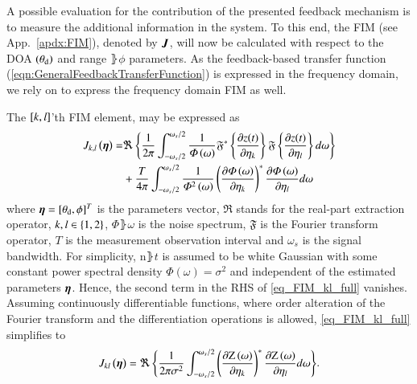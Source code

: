 A possible evaluation for the contribution of the presented feedback mechanism is to measure the additional information in the system.
To this end, the FIM (see App.~\ref{apdx:FIM}), denoted by $\boldsymbol{J}$, will now be calculated with respect to the DOA $\left({\theta_{\text{d}}}\right)$ and range $\rBrace{\phi}$ parameters. 
As the feedback-based transfer function (\ref{eqn:GeneralFeedbackTransferFunction}) is expressed in the frequency domain, we rely on \cite{zeira1990frequency} to express the frequency domain FIM as well. 
\par The $\left[{k,l}\right]$'th FIM element, may be expressed as
\begin{equation}\label{eq_FIM_kl_full}
    {
        \begin{split}
            J_{k,l}\left({\boldsymbol{\eta}}\right) 
            =&
            \Re\left\{{
            \frac{1}{2\pi}
            \int_{-\omega_{s}/2}^{\omega_{s}/2}
            {
            \frac{1}{\Phi\left({\omega}\right)}
            \mathfrak{F}^{*}\left\{
            \frac{\partial z(t)}{\partial\eta_{k}}
            \right\}
            \mathfrak{F}\left\{
            \frac{\partial z(t)}{\partial\eta_{l}}
            \right\}
            d\omega
            }}\right\}
            \\ &+
            \frac{T}{4\pi}
            \int_{-\omega_{s}/2}^{\omega_{s}/2}
            \frac{1}{\Phi^{2}\left({\omega}\right)}
            \left({\frac{\partial\Phi\left({\omega}\right)}{\partial\eta_{k}}}\right)^{\ast}
            \frac{\partial\Phi\left({\omega}\right)}{\partial\eta_{l}}
            d\omega
        \end{split}
    }
\end{equation}
where $ \boldsymbol{\eta} = [\theta_{\text{d}},\phi]^{T} $ is the parameters vector, $\Re$ stands for the real-part extraction operator, $k,l \in\left\{{1,2}\right\}$, $\Phi\rBrace{\omega}$ is the noise spectrum, $\mathfrak{F}$ is the Fourier transform operator, $T$ is the measurement observation interval and $\omega_{s}$ is the signal bandwidth. 
For simplicity, $\text{n}\rBrace{t}$ is assumed to be white Gaussian with some constant power spectral density $\Phi(\omega)=\sigma^2$ and independent of the estimated parameters $\boldsymbol{\eta}$. Hence, the second term in the RHS of \eqref{eq_FIM_kl_full} vanishes. 
Assuming continuously differentiable functions, where order alteration of the Fourier transform and the differentiation operations is allowed, \eqref{eq_FIM_kl_full} simplifies to
\begin{equation}
    \label{eq_beamPatternFreqDomain_FIM}
        \begin{split}
            J_{kl}\rBrace{\vEta} = 
            \Re\cBrace{
            \frac{1}{2\pi\sigma^2}
            \int_{-\omega_{s}/2}^{\omega_{s}/2}
            {
            \rBrace{\frac{\partial{}\F{z}\rBrace{\omega}}{\partial\eta_{k}}}^{\ast}
            \frac{\partial{}\F{z}\rBrace{\omega}}{\partial\eta_{l}}
            d\omega
            }}
        \end{split}.
\end{equation}
